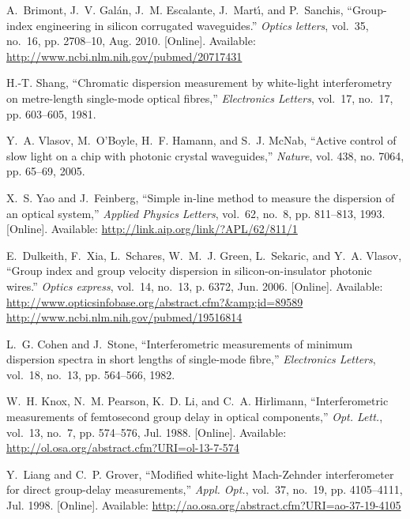 \documentclass[journal]{IEEEtran}
\begin{document}
\begin{thebibliography}{10}
\BIBentryALTinterwordspacing
A.~Brimont, J.~V. Gal\'{a}n, J.~M. Escalante, J.~Mart\'{\i}, and P.~Sanchis,
  ``{Group-index engineering in silicon corrugated waveguides.}'' \emph{Optics
  letters}, vol.~35, no.~16, pp. 2708--10, Aug. 2010. [Online]. Available:
  \url{http://www.ncbi.nlm.nih.gov/pubmed/20717431}
\BIBentrySTDinterwordspacing

H.-T. Shang, ``{Chromatic dispersion measurement by white-light interferometry
  on metre-length single-mode optical fibres},'' \emph{Electronics Letters},
  vol.~17, no.~17, pp. 603--605, 1981.

Y.~A. Vlasov, M.~O'Boyle, H.~F. Hamann, and S.~J. McNab, ``{Active control of
  slow light on a chip with photonic crystal waveguides},'' \emph{Nature}, vol.
  438, no. 7064, pp. 65--69, 2005.

\BIBentryALTinterwordspacing
X.~S. Yao and J.~Feinberg, ``{Simple in-line method to measure the dispersion
  of an optical system},'' \emph{Applied Physics Letters}, vol.~62, no.~8, pp.
  811--813, 1993. [Online]. Available:
  \url{http://link.aip.org/link/?APL/62/811/1}
\BIBentrySTDinterwordspacing

\BIBentryALTinterwordspacing
E.~Dulkeith, F.~Xia, L.~Schares, W.~M.~J. Green, L.~Sekaric, and Y.~A. Vlasov,
  ``{Group index and group velocity dispersion in silicon-on-insulator photonic
  wires.}'' \emph{Optics express}, vol.~14, no.~13, p. 6372, Jun. 2006.
  [Online]. Available:
  \url{http://www.opticsinfobase.org/abstract.cfm?\&amp;id=89589
  http://www.ncbi.nlm.nih.gov/pubmed/19516814}
\BIBentrySTDinterwordspacing

L.~G. Cohen and J.~Stone, ``{Interferometric measurements of minimum dispersion
  spectra in short lengths of single-mode fibre},'' \emph{Electronics Letters},
  vol.~18, no.~13, pp. 564--566, 1982.

\BIBentryALTinterwordspacing
W.~H. Knox, N.~M. Pearson, K.~D. Li, and C.~A. Hirlimann, ``{Interferometric
  measurements of femtosecond group delay in optical components},'' \emph{Opt.
  Lett.}, vol.~13, no.~7, pp. 574--576, Jul. 1988. [Online]. Available:
  \url{http://ol.osa.org/abstract.cfm?URI=ol-13-7-574}
\BIBentrySTDinterwordspacing

\BIBentryALTinterwordspacing
Y.~Liang and C.~P. Grover, ``{Modified white-light Mach-Zehnder interferometer
  for direct group-delay measurements},'' \emph{Appl. Opt.}, vol.~37, no.~19,
  pp. 4105--4111, Jul. 1998. [Online]. Available:
  \url{http://ao.osa.org/abstract.cfm?URI=ao-37-19-4105}
\BIBentrySTDinterwordspacing

\end{thebibliography}

%
%
\end{document}
